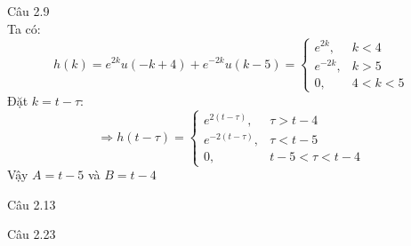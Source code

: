 \documentclass[11pt]{exam}
\begin{document}
\begin{questions}
\question Câu 2.9 \\
    Ta có:
    \begin{equation*}
        h(k) = e^{2k}u(-k+4) + e^{-2k}u(k - 5) = 
        \begin{cases}
            e^{2k}, & k < 4 \\
            e^{-2k}, & k > 5 \\
            0, & 4 < k < 5
        \end{cases}
    \end{equation*}
    Đặt $k = t - \tau$:
    \begin{equation*}
        \Rightarrow h(t-\tau) = 
        \begin{cases}
            e^{2(t-\tau)}, & \tau > t - 4 \\
            e^{-2(t-\tau)}, & \tau < t - 5 \\
            0, & t - 5 < \tau < t - 4
        \end{cases}
    \end{equation*}
    Vậy $ A = t - 5$ và $B = t - 4$


\question Câu 2.13
\question Câu 2.23


\end{questions}
\end{document}
